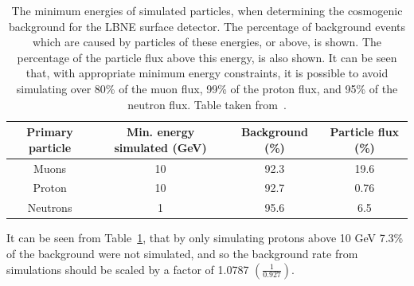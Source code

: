 \begin{table}
  \caption[The minimum energies of simulated particles, when determining the cosmogenic background for the LBNE surface detector]
          {The minimum energies of simulated particles, when determining the cosmogenic background for the LBNE surface detector. The percentage of background events which are caused by particles of these energies, or above, is shown. The percentage of the particle flux above this energy, is also shown. It can be seen that, with appropriate minimum energy constraints, it is possible to avoid simulating over 80\% of the muon flux, 99\% of the proton flux, and 95\% of the neutron flux. Table taken from~\citep{MartinsThesis}.}
  \centering
  \label{tab:SurfEnPrim}
  \begin{tabular}{c c c c}
    \toprule
        {Primary particle} & {Min. energy simulated (GeV)} & {Background (\%)} & {Particle flux (\%)} \\ 
        \midrule
        Muons              & 10                            & 92.3              & 19.6                 \\

        Proton             & 10                            & 92.7              & 0.76                 \\

        Neutrons           & 1                             & 95.6              & 6.5                  \\
    \bottomrule
  \end{tabular}
\end{table}

It can be seen from Table~\ref{tab:SurfEnPrim}, that by only simulating protons above 10 GeV 7.3\% of the background were not simulated, and so the background rate from simulations should be scaled by a factor of 1.0787 $\left(\frac{1}{0.927}\right)$. \\

